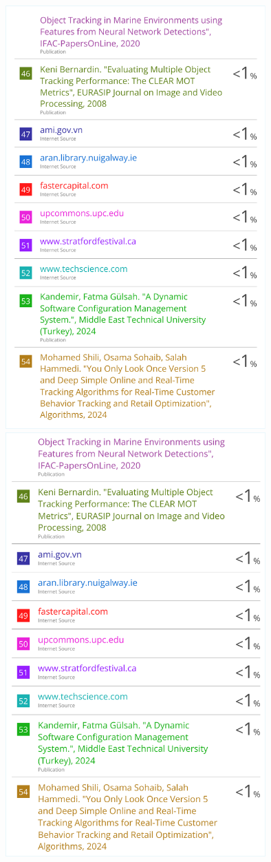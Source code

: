 \begin{center}
	\includegraphics[width=0.75\textwidth]{app/J5.pdf}
	\includegraphics[width=0.75\textwidth]{app/J6.pdf}
\end{center}

